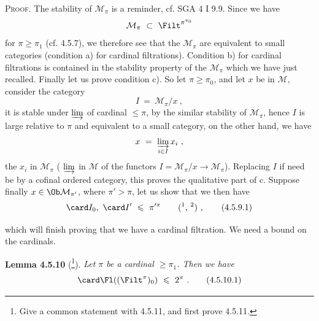 \textsc{Proof.} The stability of $\mathcal{M}_\pi$ is a reminder, cf. SGA 4 I 9.9. Since we have
\[
\mathcal{M}_\pi \ \subset \ \Filt^{\pi^{\pi_0}}
\]
for $\pi \geqslant \pi_1$ (cf. 4.5.7), we therefore see that the $\mathcal{M}_\pi$ are equivalent to small categories (condition a) for cardinal filtrations). Condition b) for cardinal filtrations is contained in the stability property of the $\mathcal{M}_\pi$ which we have just recalled. Finally let us prove condition c). So let $\pi \geqslant \pi_0$, and let $x$ be in $\mathcal{M}$, consider the category
\[
I \ = \ \mathcal{M}_\pi/x \ ,
\]
it is stable under $\varinjlim$ of cardinal $\leqslant \pi$, by the similar stability of $\mathcal{M}_\pi$, hence $I$ is large relative to $\pi$ and equivalent to a small category, on the other hand, we have
\[
x \ = \ \varinjlim_{i \in I} x_i \ ,
\]
the $x_i$ in $\mathcal{M}_\pi$ ( $\varinjlim$ in $\mathcal{M}$ of the functors $I = \mathcal{M}_\pi/x \longrightarrow \mathcal{M}_\pi$). Replacing $I$ if need be by a cofinal ordered category, this proves the qualitative part of c. Suppose finally $x \in \Ob \mathcal{M}_{\pi'}$, where $\pi' > \pi$, let us show that we then have
\[
\card I_0, \ \card I' \ \leqslant \ \pi'^{\pi} \qquad \text{(\footnotemark, \footnotemark)} \ , \tag*{(4.5.9.1)}
\]
\addtocounter{footnote}{-1}%
%
%
%
which will finish proving that we have a cardinal filtration. We need a bound on the cardinals.

\textbf{Lemma 4.5.10} (\footnote{Give a common statement with 4.5.11, and first prove 4.5.11.}). \textit{Let $\pi$ be a cardinal $\geqslant \pi_1$. Then we have} %
\[
\card \Fl((\Filt^\pi)_0) \ \leqslant \ 2^\pi \ . \tag*{(4.5.10.1)}
\]

